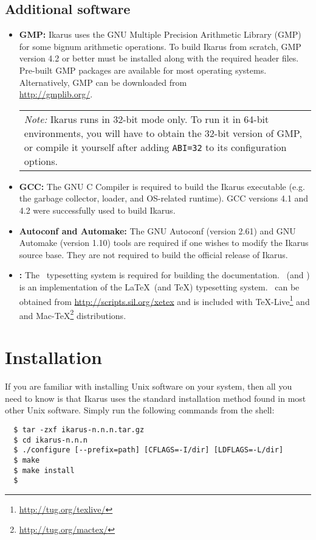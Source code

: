\documentclass[onecolumn, 12pt, twoside, openright, dvipdfm]{book}
\newcommand{\BoxedText}[2]{
  \vspace{.05in}
  \begin{center}
    \begin{tabular}{|p{4.6in}|} {\large \emph{#1}} #2 \end{tabular}
  \end{center}
  \vspace{.05in}
}
\begin{document}
\subsection{Additional software}

\begin{itemize}
\item\textbf{GMP:} Ikarus uses the GNU Multiple Precision Arithmetic
Library (GMP) for some bignum arithmetic operations.  To build
Ikarus from scratch, GMP version 4.2 or better must be installed
along with the required header files.  Pre-built GMP packages  are
available for most operating systems.  Alternatively, GMP can be
downloaded from \\
\url{http://gmplib.org/}.

\BoxedText{Note:}{Ikarus runs in 32-bit mode only.  
To run it in 64-bit environments, you will have to obtain the 32-bit
version of GMP, or compile it yourself after adding \texttt{ABI=32}
to its configuration options.}


\item\textbf{GCC:} The GNU C Compiler is required to build the Ikarus
executable (e.g. the garbage collector, loader, and OS-related
runtime).  GCC versions 4.1 and 4.2 were successfully used to build
Ikarus.

\item\textbf{Autoconf and Automake:} The GNU Autoconf (version 2.61)
and GNU Automake (version 1.10) tools are required if one
wishes to modify the Ikarus source base.  They are not
required to build the official release of Ikarus.

\item\textbf{\XeLaTeX{}:}  The \XeLaTeX\ typesetting system is
required for building the documentation.  \XeLaTeX\ (and \XeTeX) is
an implementation of the \LaTeX\ (and \TeX) typesetting system.
\XeLaTeX\ can be obtained from \url{http://scripts.sil.org/xetex}
and is included with \TeX-Live\footnote{
\url{http://tug.org/texlive/}} and and
Mac-\TeX\footnote{\url{http://tug.org/mactex/}} distributions.


\end{itemize}

\section{Installation}

If you are familiar with installing Unix software on your system,
then all you need to know is that Ikarus uses the standard
installation method found in most other Unix software.  Simply run
the following commands from the shell:
\begin{verbatim}
  $ tar -zxf ikarus-n.n.n.tar.gz
  $ cd ikarus-n.n.n
  $ ./configure [--prefix=path] [CFLAGS=-I/dir] [LDFLAGS=-L/dir]
  $ make
  $ make install
  $
\end{verbatim}
\end{document}
